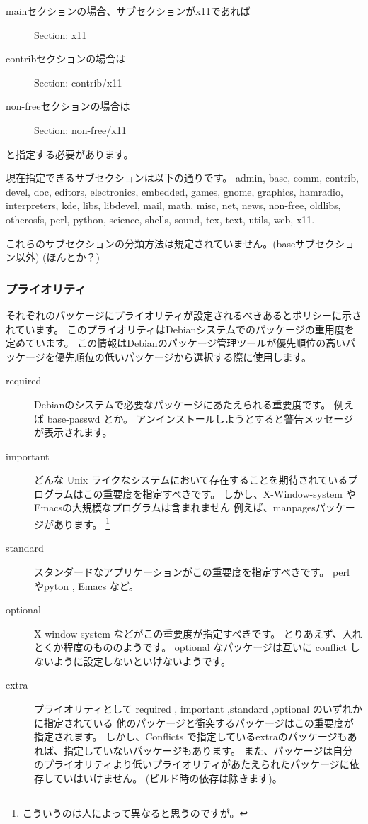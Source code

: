 \documentclass[mingoth,a4paper]{jsarticle}
\begin{document}
\begin{description}
	\item [mainセクションの場合、サブセクションがx11であれば]
		Section: x11
	\item [contribセクションの場合は]
		Section: contrib/x11
	\item [non-freeセクションの場合は]
		Section: non-free/x11
\end{description}
	と指定する必要があります。


現在指定できるサブセクションは以下の通りです。
admin, base, comm, contrib, devel, doc, editors, electronics, embedded, games, gnome, graphics, hamradio, 
interpreters, kde, libs, libdevel, mail, math, misc, net, news, non-free, oldlibs, otherosfs, perl, python, 
science, shells, sound, tex, text, utils, web, x11.


これらのサブセクションの分類方法は規定されていません。(baseサブセクション以外)
(ほんとか？)

\subsubsection{プライオリティ}
それぞれのパッケージにプライオリティが設定されるべきあるとポリシーに示されています。
このプライオリティはDebianシステムでのパッケージの重用度を定めています。
この情報はDebianのパッケージ管理ツールが優先順位の高いパッケージを優先順位の低いパッケージから選択する際に使用します。

\begin{description}
 \item[required] 
Debianのシステムで必要なパッケージにあたえられる重要度です。
例えば base-passwd とか。
アンインストールしようとすると警告メッセージが表示されます。

 \item[important] 
どんな Unix ライクなシステムにおいて存在することを期待されているプログラムはこの重要度を指定すべきです。
しかし、X-Window-system や Emacsの大規模なプログラムは含まれません
例えば、manpagesパッケージがあります。
\footnote{こういうのは人によって異なると思うのですが。}

 \item[standard]
スタンダードなアプリケーションがこの重要度を指定すべきです。
perl やpyton , Emacs など。

 \item[optional] 
X-window-system などがこの重要度が指定すべきです。
とりあえず、入れとくか程度のもののようです。
optional なパッケージは互いに conflict しないように設定しないといけないようです。

 \item[extra]

プライオリティとして  required , important ,standard ,optional のいずれかに指定されている
他のパッケージと衝突するパッケージはこの重要度が指定されます。
しかし、Conflicts で指定しているextraのパッケージもあれば、指定していないパッケージもあります。
また、パッケージは自分のプライオリティより低いプライオリティがあたえられたパッケージに依存していはいけません。
(ビルド時の依存は除きます)。
\end{description}
\end{document}
